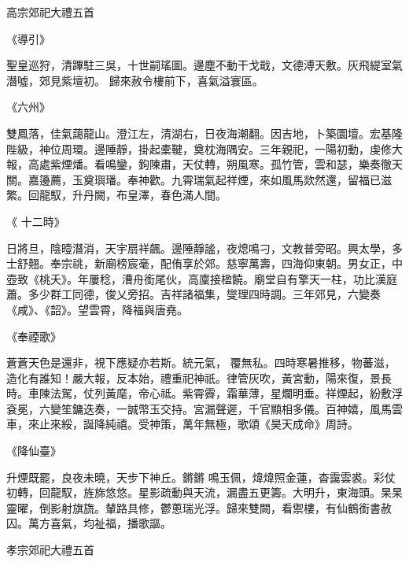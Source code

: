 
\begin{pinyinscope}

 高宗郊祀大禮五首



 《導引》



 聖皇巡狩，清蹕駐三吳，十世嗣瑤圖。邊塵不動干戈戢，文德溥天敷。灰飛緹室氣潛噓，郊見紫壇初。
 歸來赦令樓前下，喜氣溢寰區。



 《六州》



 雙鳳落，佳氣藹龍山。澄江左，清湖右，日夜海潮翻。因吉地，卜築圜壇。宏基隆陛級，神位周環。邊陲靜，掛起橐鞬，奠枕海隅安。三年親祀，一陽初動，虔修大報，高處紫煙燔。看鳴鑾，鉤陳肅，天仗轉，朔風寒。孤竹管，雲和瑟，樂奏徹天關。嘉籩薦，玉奠璵璠。奉神歡。九霄瑞氣起祥煙，來如風馬欻然還，留福已滋繁。回龍馭，升丹闕，布皇澤，春色滿人間。



 《
 十二時》



 日將旦，陰曀潛消，天宇扇祥飆。邊陲靜謐，夜熄鳴刁，文教普旁昭。興太學，多士舒翹。奉宗祧，新廟榜宸毫，配侑享於郊。慈寧萬壽，四海仰東朝。男女正，中壺致《桃夭》。年屢稔，漕舟銜尾伙，高廩接楹饒。廟堂自有擎天一柱，功比漢庭蕭。多少群工同德，俊乂旁招。吉祥諸福集，燮理四時調。三年郊見，六變奏《咸》、《韶》。望雲霄，降福與唐堯。



 《奉禋歌》



 蒼蒼天色是還非，視下應疑亦若斯。統元氣，
 覆無私。四時寒暑推移，物蕃滋，造化有誰知！嚴大報，反本始，禮重祀神祇。律管灰吹，黃宮動，陽來復，景長時。車陳法駕，仗列黃麾，帝心祗。紫霄霽，霜華薄，星爛明垂。祥煙起，紛敷浮袞冕，六變笙鏞迭奏，一誠幣玉交持。宮漏聲遲，千官顯相多儀。百神嬉，風馬雲車，來止來綏，誕降純禧。受神策，萬年無極，歌頌《昊天成命》周詩。



 《降仙臺》



 升煙既罷，良夜未曉，天步下神丘。鏘鏘
 鳴玉佩，煒煒照金蓮，杳靄雲裘。彩仗初轉，回龍馭，旌旆悠悠。星影疏動與天流，漏盡五更籌。大明升，東海頭。杲杲靈曜，倒影射旗旒。輦路具修，鬱蔥瑞光浮。歸來雙闕，看禦樓，有仙鶴銜書赦囚。萬方喜氣，均祉福，播歌謳。



 孝宗郊祀大禮五首




\end{pinyinscope}
